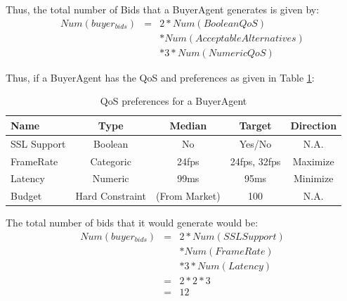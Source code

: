\documentclass[10pt,journal,compsoc]{IEEEtran}
\begin{document}
Thus, the total number of Bids that a BuyerAgent generates is given by:
\setlength{\arraycolsep}{0.0em}
\begin{eqnarray}
Num(buyer_{bids})&{} = &{ }2 * Num(BooleanQoS)\nonumber\\
						  && *{ }  Num(AcceptableAlternatives)\nonumber\\
						  && *{ } 3 * Num(NumericQoS)
\end{eqnarray}
\setlength{\arraycolsep}{5pt}

Thus, if a BuyerAgent has the QoS and preferences as given in Table \ref{tbl:sample_qos_preferences}:

\begin{table}
\vspace*{0.1cm}
\centering
\begin{tabular}{lcccc}
\toprule
\textbf{Name} & \textbf{Type} & \textbf{Median} & \textbf{Target} & \textbf{Direction} \\ 
\midrule
SSL Support & Boolean & No & Yes/No & N.A. \\ 
FrameRate & Categoric & 24fps & 24fps, 32fps & Maximize \\ 
Latency & Numeric & 99ms & 95ms	& Minimize \\ 
Budget & Hard Constraint & (From Market) &  100 & N.A. \\ 
\bottomrule
\end{tabular}
\caption{QoS preferences for a BuyerAgent \label{tbl:sample_qos_preferences}}
\end{table}

The total number of bids that it would generate would be:
\begin{eqnarray} \label{eqn:num_generated_bids}
Num(buyer_{bids}) &=& 2 * Num(SSL Support)\nonumber\\
					&&  * Num(FrameRate)\nonumber\\
					&& 	* 3 * Num(Latency)\nonumber \\
		            &=& 2 * 2 * 3  \nonumber \\
        		    &=& 12 \nonumber
\end{eqnarray}
\end{document}
